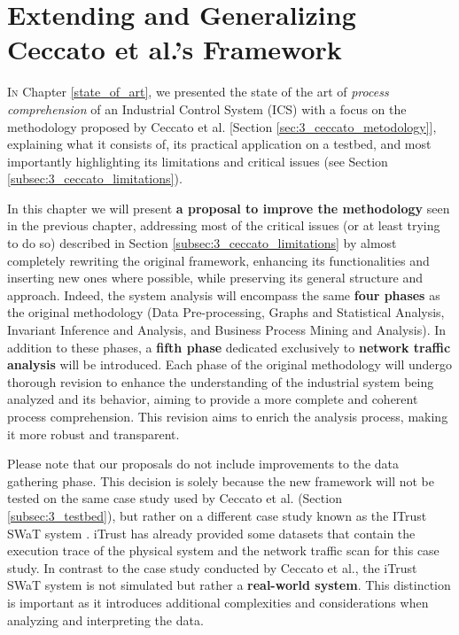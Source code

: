 \chapter{Extending and Generalizing Ceccato et al.’s Framework}
\label{chap:proposal}

\lettrine[lines=2]{I}{n} Chapter \ref{state_of_art}, we presented the state of the art of \textit{process comprehension} of an Industrial Control System (ICS) with a focus on the methodology proposed by Ceccato et al. \cite{ceccato}[Section \ref{sec:3_ceccato_metodology}], explaining what it consists of, its practical application on a testbed, and most importantly highlighting its limitations and critical issues (see Section \ref{subsec:3_ceccato_limitations}).

\bigskip
In this chapter we will present \textbf{a proposal to improve the methodology} seen in the previous chapter, addressing most of the critical issues (or at least trying to do so) described in Section \ref{subsec:3_ceccato_limitations} by almost completely rewriting the original framework, enhancing its functionalities and inserting new ones where possible, while preserving its general structure and approach. Indeed, the system analysis will encompass the same \textbf{four phases} as the original methodology (Data Pre-processing, Graphs and Statistical Analysis, Invariant Inference and Analysis, and Business Process Mining and Analysis). In addition to these phases, a \textbf{fifth phase} dedicated exclusively to \textbf{network traffic analysis} will be introduced. Each phase of the original methodology will undergo thorough revision to enhance the understanding of the industrial system being analyzed and its behavior, aiming to provide a more complete and coherent process comprehension. This revision aims to enrich the analysis process, making it more robust and transparent.

\bigskip
Please note that our proposals do not include improvements to the data gathering phase. This decision is solely because the new framework will not be tested on the same case study used by Ceccato et al. (Section \ref{subsec:3_testbed}), but rather on a different case study known as the ITrust SWaT system \cite{swat_home}. iTrust has already provided some datasets that contain the execution trace of the physical system and the network traffic scan for this case study. In contrast to the case study conducted by Ceccato et al., the iTrust SWaT system is not simulated but rather a \textbf{real-world system}. This distinction is important as it introduces additional complexities and considerations when analyzing and interpreting the data. 

